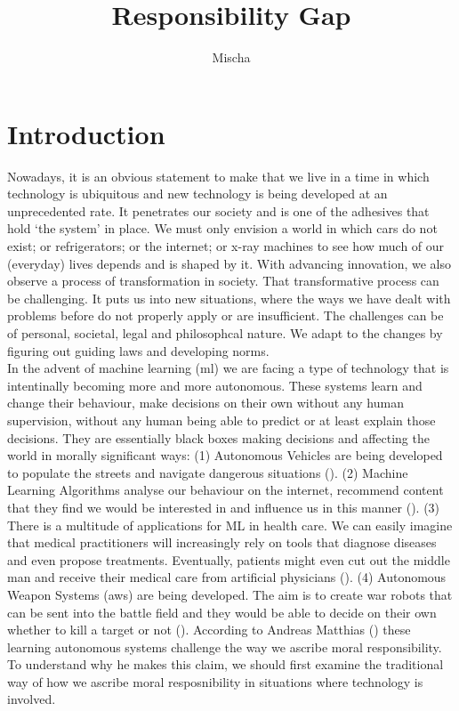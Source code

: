 \documentclass{article}
\title{Responsibility Gap}
\author{Mischa}
\begin{document}
\begin{titlepage}
	\maketitle
\end{titlepage}
\tableofcontents
\newpage
\section{Introduction}


Nowadays, it is an obvious statement to make that we live in a time in which
technology is ubiquitous and new technology is being developed at an
unprecedented rate. It penetrates our society and is one of the adhesives that
hold `the system' in place. We must only envision a world in which cars do not
exist; or refrigerators; or the internet; or x-ray machines to see how much of
our (everyday) lives depends and is shaped by it. With advancing innovation, we
also observe a process of transformation in society. That transformative process
can be challenging. It puts us into new situations, where the ways we have dealt
with problems before do not properly apply or are insufficient. The challenges
can be of personal, societal, legal and philosophcal nature. We adapt to the
changes by figuring out guiding laws and developing norms.\\

In the advent of machine learning (\acrshort{ml}) we are facing a type of technology that is
intentinally becoming more and more autonomous. These systems learn and change
their behaviour, make decisions on their own without any human supervision,
without any human being able to predict or at least explain those decisions.
They are essentially black boxes making decisions and affecting the world in
morally significant ways: (1) Autonomous Vehicles are being developed to
populate the streets and navigate dangerous situations
(\cite{faisal2019understanding}). (2) Machine Learning Algorithms analyse our
behaviour on the internet, recommend content that they find we would be
interested in and influence us in this manner (\cite{milano2020recommender}).
(3) There is a multitude of applications for ML in health care. We can easily
imagine that medical practitioners will increasingly rely on tools that diagnose
diseases and even propose treatments. Eventually, patients might even cut out
the middle man and receive their medical care from artificial physicians
(\cite{char2018implementing}). (4) Autonomous Weapon Systems (\acrshort{aws})
are being developed. The aim is to create war robots that can be sent into the
battle field and they would be able to decide on their own whether to kill a
target or not (\cite{sparrow2007killer}). According to Andreas Matthias
(\cite{Matthias_2004}) these learning autonomous systems challenge the way we
ascribe moral responsibility. To understand why he makes this claim, we should
first examine the traditional way of how we ascribe moral resposnibility in
situations where technology is involved.\\
\end{document}
